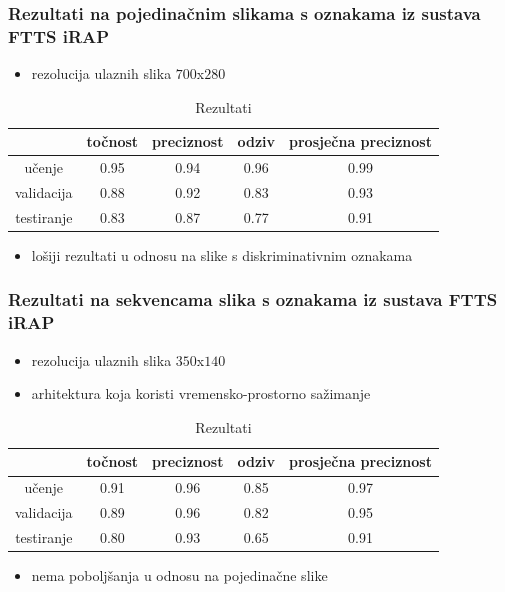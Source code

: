 \documentclass{beamer}
\begin{document}
\begin{frame}
 \frametitle{Rezultati na pojedinačnim slikama s oznakama iz sustava FTTS iRAP}
 \begin{itemize}
  \item rezolucija ulaznih slika $700$x$280$
 \end{itemize}
 
\begin{table}[H]
\centering
\caption{Rezultati}
\label{score:single_irap}
\begin{tabular}{c|c|c|c|c|}
\cline{2-5}
                                            & točnost & preciznost & odziv & prosječna preciznost \\ \hline
\multicolumn{1}{|c|}{učenje}     & 0.95       & 0.94        & 0.96     &           0.99           \\ \hline
\multicolumn{1}{|c|}{validacija} & 0.88       & 0.92        & 0.83     &            0.93          \\ \hline
\multicolumn{1}{|c|}{testiranje} & 0.83       & 0.87        & 0.77     &            0.91          \\ \hline
\end{tabular}
\end{table}

\begin{itemize}
 \item lošiji rezultati u odnosu na slike s diskriminativnim oznakama
\end{itemize}

\end{frame}

\begin{frame}
 \frametitle{Rezultati na sekvencama slika s oznakama iz sustava FTTS iRAP}
 \begin{itemize}
  \item rezolucija ulaznih slika $350$x$140$
  \item arhitektura koja koristi vremensko-prostorno sažimanje
 \end{itemize}
 
\begin{table}[H]
\centering
\caption{Rezultati}
\label{score:pooling}
\begin{tabular}{c|c|c|c|c|}
\cline{2-5}
                                            & točnost & preciznost & odziv & prosječna preciznost \\ \hline
\multicolumn{1}{|c|}{učenje}     & 0.91       & 0.96        & 0.85     &           0.97           \\ \hline
\multicolumn{1}{|c|}{validacija} & 0.89       & 0.96        & 0.82     &            0.95          \\ \hline
\multicolumn{1}{|c|}{testiranje} & 0.80       & 0.93        & 0.65     &            0.91          \\ \hline
\end{tabular}
\end{table}

\begin{itemize}
 \item nema poboljšanja u odnosu na pojedinačne slike
\end{itemize}

\end{frame}
\end{document}
